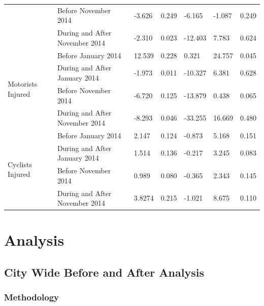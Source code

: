 \documentclass[10pt,journal,compsoc]{IEEEtran}
\begin{document}
\begin{table}[]
\begin{tabular}{|l|l|l|l|l|l|l|}
                                     & Before November 2014 & -3.626      & 0.249 & -6.165                 & -1.087               & 0.249   \\ \cline{2-7} 
                                     & During and After November 2014  & -2.310      & 0.023 & -12.403                & 7.783                & 0.624   \\ \hline
\multirow{4}{*}{Motorists Injured}   & Before January 2014 & 12.539      & 0.228 & 0.321                  & 24.757               & 0.045   \\ \cline{2-7} 
                                     & During and After January 2014  & -1.973      & 0.011 & -10.327                & 6.381                & 0.628   \\ \cline{2-7} 
                                     & Before November 2014 & -6.720      & 0.125 & -13.879                & 0.438                & 0.065   \\ \cline{2-7} 
                                     & During and After November 2014  & -8.293      & 0.046 & -33.255                & 16.669               & 0.480   \\ \hline
\multirow{4}{*}{Cyclists Injured}    & Before January 2014 & 2.147       & 0.124 & -0.873                 & 5.168                & 0.151   \\ \cline{2-7} 
                                     & During and After January 2014  & 1.514       & 0.136 & -0.217                 & 3.245                & 0.083   \\ \cline{2-7} 
                                     & Before November 2014 & 0.989       & 0.080 & -0.365                 & 2.343                & 0.145   \\ \cline{2-7} 
                                     & During and After November 2014  & 3.8274      & 0.215 & -1.021                 & 8.675                & 0.110   \\ \hline
\end{tabular}
\end{table}

\section{Analysis}
\subsection{City Wide Before and After Analysis}

\subsubsection{Methodology}
\end{document}
